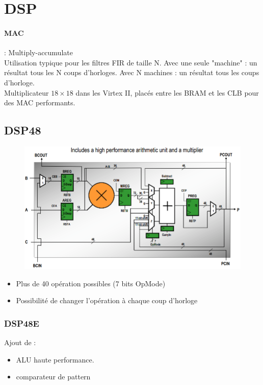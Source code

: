 \documentclass[resume]{subfiles}
\begin{document}
\section{DSP}



\paragraph{MAC} : Multiply-accumulate\\
Utilisation typique pour les filtres FIR de taille N. Avec une seule "machine" : un résultat tous les N coups d'horloges. Avec N machines : un résultat tous les coups d'horloge.\\
Multiplicateur $18\times 18$ dans les Virtex II, placés entre les BRAM et les CLB pour des MAC performants.
\subsection{DSP48}
\begin{figure}[H]
\centering
\includegraphics[width=\columnwidth]{img_2.png}
\end{figure}
\begin{itemize}
\item Plus de 40 opération possibles (7 bits OpMode)
\item Possibilité de changer l'opération à chaque coup d'horloge
\end{itemize}
\subsubsection{DSP48E}
Ajout de :
\begin{itemize}
\item ALU haute performance.
\item comparateur de pattern
\end{itemize}
\end{document}
